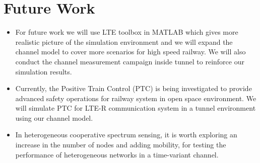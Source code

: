 \section{Future Work}
\begin{itemize}
\item For future work we will use LTE toolbox in MATLAB which gives more realistic picture of the simulation environment and we will expand the channel model to cover more scenarios for high speed railway. We will also conduct the channel measurement campaign inside tunnel to reinforce our simulation results.

\item Currently, the Positive Train Control (PTC) is being investigated to provide advanced safety operations for railway system in open space environment. We will simulate PTC for LTE-R communication system in a tunnel environment using our channel model.

\item In heterogeneous cooperative spectrum sensing, it is worth exploring an increase in the number of nodes and adding mobility, for testing the performance of heterogeneous networks in a time-variant channel.
\end{itemize}

